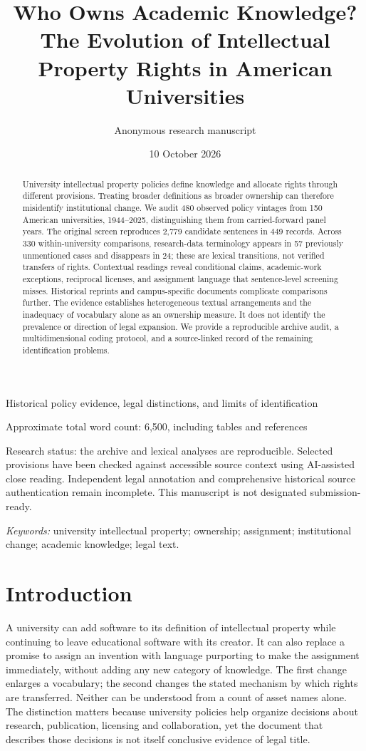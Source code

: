 \documentclass[12pt]{article}
\title{Who Owns Academic Knowledge?\\The Evolution of Intellectual Property Rights in American Universities}
\author{Anonymous research manuscript}
\date{10 October 2026}
\begin{document}
\maketitle
\begin{center}
Historical policy evidence, legal distinctions, and limits of identification

Approximate total word count: 6,500, including tables and references
\end{center}
\vfill
\noindent Research status: the archive and lexical analyses are reproducible. Selected provisions have been checked against accessible source context using AI-assisted close reading. Independent legal annotation and comprehensive historical source authentication remain incomplete. This manuscript is not designated submission-ready.
\newpage
\begin{abstract}
University intellectual property policies define knowledge and allocate rights through different provisions. Treating broader definitions as broader ownership can therefore misidentify institutional change. We audit 480 observed policy vintages from 150 American universities, 1944--2025, distinguishing them from carried-forward panel years. The original screen reproduces 2,779 candidate sentences in 449 records. Across 330 within-university comparisons, research-data terminology appears in 57 previously unmentioned cases and disappears in 24; these are lexical transitions, not verified transfers of rights. Contextual readings reveal conditional claims, academic-work exceptions, reciprocal licenses, and assignment language that sentence-level screening misses. Historical reprints and campus-specific documents complicate comparisons further. The evidence establishes heterogeneous textual arrangements and the inadequacy of vocabulary alone as an ownership measure. It does not identify the prevalence or direction of legal expansion. We provide a reproducible archive audit, a multidimensional coding protocol, and a source-linked record of the remaining identification problems.
\end{abstract}
\noindent\textit{Keywords:} university intellectual property; ownership; assignment; institutional change; academic knowledge; legal text.

\section{Introduction}
A university can add software to its definition of intellectual property while continuing to leave educational software with its creator. It can also replace a promise to assign an invention with language purporting to make the assignment immediately, without adding any new category of knowledge. The first change enlarges a vocabulary; the second changes the stated mechanism by which rights are transferred. Neither can be understood from a count of asset names alone. The distinction matters because university policies help organize decisions about research, publication, licensing and collaboration, yet the document that describes those decisions is not itself conclusive evidence of legal title.
\end{document}
